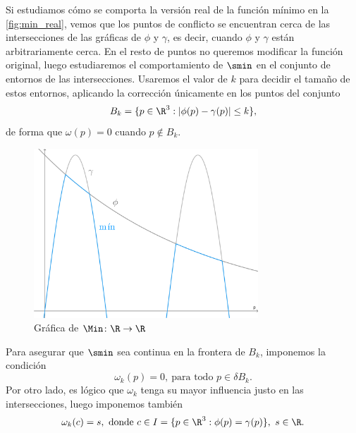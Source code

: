 Si estudiamos cómo se comporta la versión real de la función mínimo en la \autoref{fig:min_real}, vemos que los puntos de conflicto se encuentran cerca de las intersecciones de las gráficas de $\phi$ y $\gamma$, es decir, cuando $\phi$ y $\gamma$ están arbitrariamente cerca. En el resto de puntos no queremos modificar la función original, luego estudiaremos el comportamiento de $\smin$ en el conjunto de entornos de las intersecciones. Usaremos el valor de $k$ para decidir el tamaño de estos entornos, aplicando la corrección únicamente en los puntos del conjunto
\begin{equation*}
    B_{k} = \{p\in\R^3 : |\phi(p)-\gamma(p)| \le k\},
\end{equation*}
de forma que $\omega(p) = 0$ cuando $p\notin B_{k}$.\newline

\begin{figure}[t]
    \centering
    \includegraphics[width=0.75\textwidth]{Plantilla-TFG-master/img/smooth_real.png}
    \caption{Gráfica de $\Min\colon \R\to\R$}
    \label{fig:min_real}
\end{figure}

Para asegurar que $\smin$ sea continua en la frontera de $B_{k}$, imponemos la condición 
\begin{equation*}
    \omega_k(p) = 0,\ \text{para todo } p \in \delta B_{k}.
\end{equation*}
Por otro lado, es lógico que $\omega_k$ tenga su mayor influencia justo en las intersecciones, luego imponemos también 
\begin{equation*}
    \omega_k(c) = s, \text{ donde } c \in I = \{p\in\R^3 : \phi(p) = \gamma(p)\},\ s\in \R.
\end{equation*}

